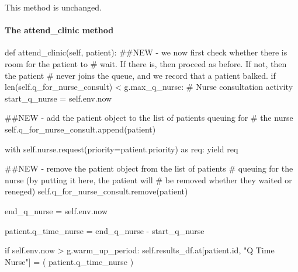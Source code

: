 \documentclass[
  letterpaper,
  DIV=11,
  numbers=noendperiod]{scrreprt}
\let\oldparagraph\paragraph
\renewcommand{\paragraph}[1]{\oldparagraph{#1}\mbox{}}
\newenvironment{Shaded}{}{}
\newcommand{\BuiltInTok}[1]{\textcolor[rgb]{0.84,0.23,0.29}{#1}}
\newcommand{\CommentTok}[1]{\textcolor[rgb]{0.42,0.45,0.49}{#1}}
\newcommand{\ControlFlowTok}[1]{\textcolor[rgb]{0.84,0.23,0.29}{#1}}
\newcommand{\ImportTok}[1]{\textcolor[rgb]{0.01,0.18,0.38}{#1}}
\newcommand{\KeywordTok}[1]{\textcolor[rgb]{0.84,0.23,0.29}{#1}}
\newcommand{\NormalTok}[1]{\textcolor[rgb]{0.14,0.16,0.18}{#1}}
\newcommand{\OperatorTok}[1]{\textcolor[rgb]{0.14,0.16,0.18}{#1}}
\newcommand{\StringTok}[1]{\textcolor[rgb]{0.01,0.18,0.38}{#1}}
\newcommand{\VariableTok}[1]{\textcolor[rgb]{0.89,0.38,0.04}{#1}}
\begin{document}
This method is unchanged.

\paragraph{The attend\_clinic method}\label{the-attend_clinic-method-4}

\begin{Shaded}
\begin{Highlighting}[]
\KeywordTok{def}\NormalTok{ attend\_clinic(}\VariableTok{self}\NormalTok{, patient):}
        \CommentTok{\#\#NEW {-} we now first check whether there is room for the patient to}
        \CommentTok{\# wait.  If there is, then proceed as before.  If not, then the patient}
        \CommentTok{\# never joins the queue, and we record that a patient balked.}
        \ControlFlowTok{if} \BuiltInTok{len}\NormalTok{(}\VariableTok{self}\NormalTok{.q\_for\_nurse\_consult) }\OperatorTok{\textless{}}\NormalTok{ g.max\_q\_nurse:}
            \CommentTok{\# Nurse consultation activity}
\NormalTok{            start\_q\_nurse }\OperatorTok{=} \VariableTok{self}\NormalTok{.env.now}

            \CommentTok{\#\#NEW {-} add the patient object to the list of patients queuing for}
            \CommentTok{\# the nurse}
            \VariableTok{self}\NormalTok{.q\_for\_nurse\_consult.append(patient)}

            \ControlFlowTok{with} \VariableTok{self}\NormalTok{.nurse.request(priority}\OperatorTok{=}\NormalTok{patient.priority) }\ImportTok{as}\NormalTok{ req:}
                \ControlFlowTok{yield}\NormalTok{ req}

                \CommentTok{\#\#NEW {-} remove the patient object from the list of patients}
                \CommentTok{\# queuing for the nurse (by putting it here, the patient will}
                \CommentTok{\# be removed whether they waited or reneged)}
                \VariableTok{self}\NormalTok{.q\_for\_nurse\_consult.remove(patient)}

\NormalTok{                end\_q\_nurse }\OperatorTok{=} \VariableTok{self}\NormalTok{.env.now}

\NormalTok{                patient.q\_time\_nurse }\OperatorTok{=}\NormalTok{ end\_q\_nurse }\OperatorTok{{-}}\NormalTok{ start\_q\_nurse}

                \ControlFlowTok{if} \VariableTok{self}\NormalTok{.env.now }\OperatorTok{\textgreater{}}\NormalTok{ g.warm\_up\_period:}
                    \VariableTok{self}\NormalTok{.results\_df.at[patient.}\BuiltInTok{id}\NormalTok{, }\StringTok{"Q Time Nurse"}\NormalTok{] }\OperatorTok{=}\NormalTok{ (}
\NormalTok{                        patient.q\_time\_nurse}
\NormalTok{                    )}


\end{Highlighting}
\end{Shaded}
\end{document}
